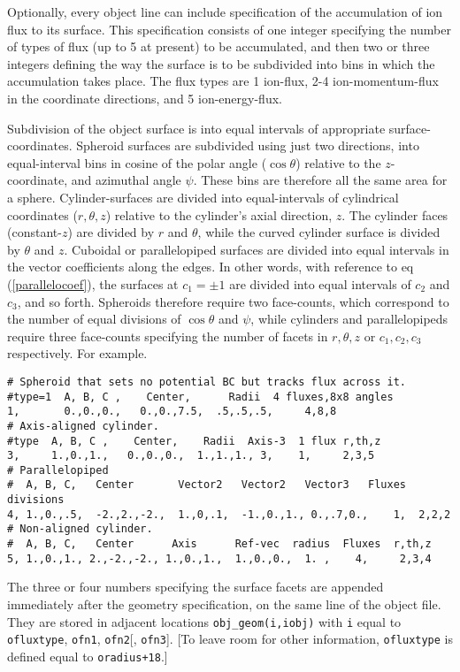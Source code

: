 \documentclass[12pt]{article}
\begin{document}
Optionally, every object line can include specification of the
accumulation of ion flux to its surface. This specification consists
of one integer specifying the number of types of flux (up to 5 at
present) to be accumulated, and then two or three integers defining
the way the surface is to be subdivided into bins in which the
accumulation takes place. The flux types are 1 ion-flux, 2-4
ion-momentum-flux in the coordinate directions, and 5 ion-energy-flux.

Subdivision of the object surface is into equal intervals of
appropriate surface-coordinates. Spheroid surfaces are subdivided
using just two directions, into equal-interval bins in cosine of the
polar angle ($\cos\theta$) relative to the $z$-coordinate, and
azimuthal angle $\psi$. These bins are therefore all the same
area for a sphere. Cylinder-surfaces are divided into equal-intervals of
cylindrical coordinates ($r,\theta,z$) relative to the cylinder's
axial direction, $z$. The cylinder faces (constant-$z$) are divided by
$r$ and $\theta$, while the curved cylinder surface is divided by
$\theta$ and $z$. Cuboidal or parallelopiped surfaces are divided
into equal intervals in the vector coefficients along the edges. In
other words, with reference to eq (\ref{parallelocoef}), the surfaces
at $c_1=\pm1$ are divided into equal intervals of $c_2$ and $c_3$, and
so forth. Spheroids therefore require two face-counts, which
correspond to the number of equal divisions of $\cos\theta$ and
$\psi$, while cylinders and parallelopipeds require three face-counts
specifying the number of facets in $r,\theta,z$ or $c_1,c_2,c_3$
respectively. For example.

\begin{verbatim}
# Spheroid that sets no potential BC but tracks flux across it.
#type=1  A, B, C ,    Center,      Radii  4 fluxes,8x8 angles
1,       0.,0.,0.,   0.,0.,7.5,  .5,.5,.5,     4,8,8
# Axis-aligned cylinder.
#type  A, B, C ,    Center,    Radii  Axis-3  1 flux r,th,z
3,     1.,0.,1.,   0.,0.,0.,  1.,1.,1., 3,    1,     2,3,5
# Parallelopiped
#  A, B, C,   Center       Vector2   Vector2   Vector3   Fluxes divisions
4, 1.,0.,.5,  -2.,2.,-2.,  1.,0,.1,  -1.,0.,1., 0.,.7,0.,    1,  2,2,2
# Non-aligned cylinder.
#  A, B, C,   Center      Axis      Ref-vec  radius  Fluxes  r,th,z
5, 1.,0.,1., 2.,-2.,-2., 1.,0.,1.,  1.,0.,0.,  1. ,    4,     2,3,4
\end{verbatim}

The three or four numbers specifying the surface facets are appended
immediately after the geometry specification, on the same line of the
object file. They are stored in adjacent locations
\verb!obj_geom(i,iobj)! with \verb!i!  equal to \verb!ofluxtype!,
\verb!ofn1!, \verb!ofn2![, \verb!ofn3!].  [To leave room for other
  information, \verb!ofluxtype! is defined equal to \verb!oradius+18!.]
\end{document}
